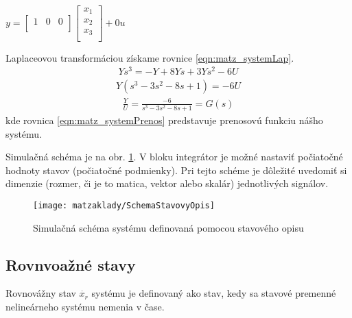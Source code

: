 \documentclass[../main.tex]{subfiles}
\begin{document}
        \begin{center}
		$y  = 
		\begin{bmatrix} 
			1 & 0 & 0 \\ 
		\end{bmatrix} 
		\begin{bmatrix} 
			x_1 \\ 
			x_2 \\ 
			x_3 \\ 
		\end{bmatrix} +
		0u $
	\label{eqn:matz_system2}
        \end{center}
Laplaceovou transformáciou získame rovnice \ref{eqn:matz_systemLap}. 
\begin{equation}
	\begin{aligned}
		Ys^3 = -Y + 8 Ys + 3Ys^2 - 6U
	\end{aligned}
	\label{eqn:matz_systemLap}
\end{equation}
\begin{equation}
	\begin{aligned}
		Y(s^3 -3s^2 -8s + 1) = - 6U
	\end{aligned}
\end{equation}
\begin{equation}
	\begin{aligned}
		\frac{Y}{U} = \frac{-6}{s^3 -3s^2 -8s + 1} = G(s)
	\end{aligned}
	\label{eqn:matz_systemPrenos}
\end{equation}
kde rovnica  \ref{eqn:matz_systemPrenos} predstavuje prenosovú funkciu nášho systému.

Simulačná schéma je na obr. \ref{fig:matz_systemStavovyOpisSimulink}. V bloku integrátor je možné nastaviť počiatočné hodnoty stavov (počiatočné podmienky). Pri tejto schéme je dôležité uvedomiť si dimenzie (rozmer, či je to matica, vektor alebo skalár) jednotlivých signálov.
\begin{figure}[h!]
	\centering
	\texttt{[image: matzaklady/SchemaStavovyOpis]}
	\caption{Simulačná schéma systému definovaná pomocou stavového opisu}
	\label{fig:matz_systemStavovyOpisSimulink}
\end{figure}

\subsection{Rovnvoažné stavy}
Rovnovážny stav $\dot{x_r}$ systému je definovaný ako stav, kedy sa stavové premenné nelineárneho systému nemenia v čase. 
\end{document}
